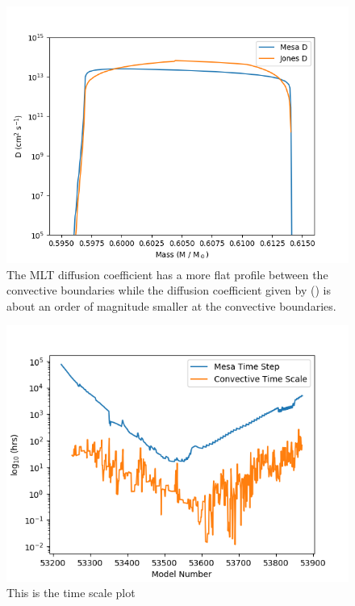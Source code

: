 \documentclass[fleqn,usenatbib]{mnras}
\begin{document}
\begin{figure}
  \includegraphics[width=\columnwidth]{figs/Diffusion_compare.png}
  \caption{The MLT diffusion coefficient has a more flat profile between the convective boundaries while the diffusion coefficient given by \citep{4pi} () is about an order of magnitude smaller at the convective boundaries.} 
\end{figure}

\begin{figure}
  \includegraphics[width=\columnwidth]{figs/Time_scale.png}
  \caption{This is the time scale plot} 
\end{figure}
\end{document}
